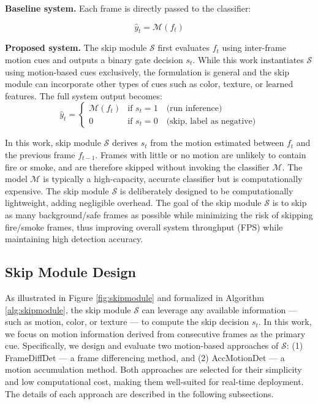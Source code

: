 \documentclass[
  10pt,
]{article}
\begin{document}
\textbf{Baseline system.} Each frame is directly passed to the
classifier:

\[\hat{y}_t = \mathcal{M}(f_t)\]

\textbf{Proposed system.} The skip module \(\mathcal{S}\) first
evaluates \(f_t\) using inter-frame motion cues and outputs a binary
gate decision \(s_t\). While this work instantiates \(\mathcal{S}\)
using motion-based cues exclusively, the formulation is general and the
skip module can incorporate other types of cues such as color, texture,
or learned features. The full system output becomes: \[
\hat{y}_t = \begin{cases} \mathcal{M}(f_t) & \text{if } s_t = 1 \quad
\text{(run inference)} \\ 0 & \text{if } s_t = 0 \quad \text{(skip, label as
negative)} \end{cases}
\]

In this work, skip module \(\mathcal{S}\) derives \(s_t\) from the
motion estimated between \(f_t\) and the previous frame \(f_{t-1}\).
Frames with little or no motion are unlikely to contain fire or smoke,
and are therefore skipped without invoking the classifier
\(\mathcal{M}\). The model \(\mathcal{M}\) is typically a high-capacity,
accurate classifier but is computationally expensive. The skip module
\(\mathcal{S}\) is deliberately designed to be computationally
lightweight, adding negligible overhead. The goal of the skip module
\(\mathcal{S}\) is to skip as many background/safe frames as possible
while minimizing the risk of skipping fire/smoke frames, thus improving
overall system throughput (FPS) while maintaining high detection
accuracy.

\subsection{Skip Module Design}\label{skip-module-design}





As illustrated in Figure \ref{fig:skipmodule} and formalized in
Algorithm \ref{alg:skipmodule}, the skip module \(\mathcal{S}\) can
leverage any available information --- such as motion, color, or texture
--- to compute the skip decision \(s_t\). In this work, we focus on
motion information derived from consecutive frames as the primary cue.
Specifically, we design and evaluate two motion-based approaches of
\(\mathcal{S}\): (1) FrameDiffDet --- a frame differencing method, and
(2) AccMotionDet --- a motion accumulation method. Both approaches are
selected for their simplicity and low computational cost, making them
well-suited for real-time deployment. The details of each approach are
described in the following subsections.
\end{document}
